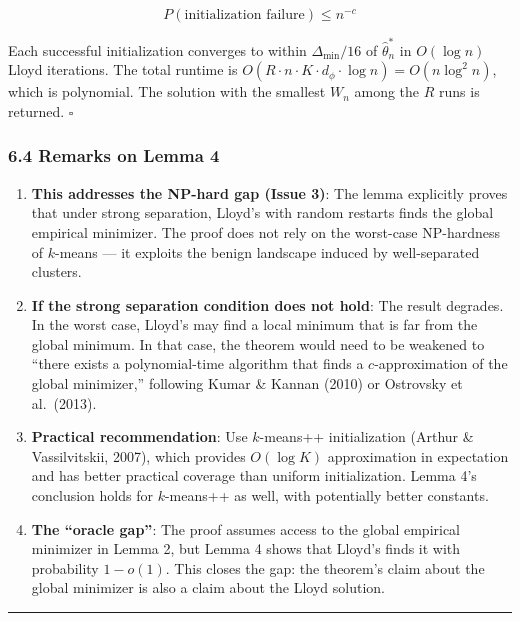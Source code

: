 \documentclass[
  12pt,
]{ctexart}
\begin{document}
\[P(\text{initialization failure}) \leq n^{-c}\]

Each successful initialization converges to within \(\Delta_{\min}/16\)
of \(\hat{\theta}_n^*\) in \(O(\log n)\) Lloyd iterations. The total
runtime is
\(O(R \cdot n \cdot K \cdot d_\phi \cdot \log n) = O(n \log^2 n)\),
which is polynomial. The solution with the smallest \(W_n\) among the
\(R\) runs is returned. \(\square\)

\subsubsection{6.4 Remarks on Lemma 4}\label{remarks-on-lemma-4}

\begin{enumerate}
\def\labelenumi{\arabic{enumi}.}
\item
  \textbf{This addresses the NP-hard gap (Issue 3)}: The lemma
  explicitly proves that under strong separation, Lloyd's with random
  restarts finds the global empirical minimizer. The proof does not rely
  on the worst-case NP-hardness of \(k\)-means --- it exploits the
  benign landscape induced by well-separated clusters.
\item
  \textbf{If the strong separation condition does not hold}: The result
  degrades. In the worst case, Lloyd's may find a local minimum that is
  far from the global minimum. In that case, the theorem would need to
  be weakened to ``there exists a polynomial-time algorithm that finds a
  \(c\)-approximation of the global minimizer,'' following Kumar \&
  Kannan (2010) or Ostrovsky et al.~(2013).
\item
  \textbf{Practical recommendation}: Use \(k\)-means++ initialization
  (Arthur \& Vassilvitskii, 2007), which provides \(O(\log K)\)
  approximation in expectation and has better practical coverage than
  uniform initialization. Lemma 4's conclusion holds for \(k\)-means++
  as well, with potentially better constants.
\item
  \textbf{The ``oracle gap''}: The proof assumes access to the global
  empirical minimizer in Lemma 2, but Lemma 4 shows that Lloyd's finds
  it with probability \(1 - o(1)\). This closes the gap: the theorem's
  claim about the global minimizer is also a claim about the Lloyd
  solution.
\end{enumerate}

\begin{center}\rule{0.5\linewidth}{0.5pt}\end{center}
\end{document}
